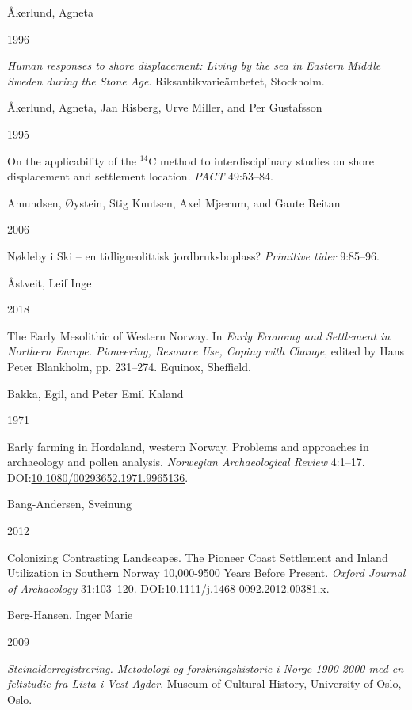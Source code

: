 \documentclass[
]{article}
\newlength{\cslhangindent}
\newlength{\csllabelwidth}
\newlength{\cslentryspacingunit} %
\newenvironment{CSLReferences}[2] %
 {%
  \setlength{\parindent}{0pt}
  \ifodd #1
  \let\oldpar\par
  \def\par{\hangindent=\cslhangindent\oldpar}
  \fi
  \setlength{\parskip}{#2\cslentryspacingunit}
 }%
 {}
\newcommand{\CSLBlock}[1]{#1\hfill\break}
\newcommand{\CSLLeftMargin}[1]{\parbox[t]{\csllabelwidth}{#1}}
\newcommand{\CSLRightInline}[1]{\parbox[t]{\linewidth - \csllabelwidth}{#1}\break}
\begin{document}
\hypertarget{refs}{}
\begin{CSLReferences}{0}{0}
\leavevmode{}%
\CSLBlock{Åkerlund, Agneta}
\CSLLeftMargin{ 1996}
\CSLRightInline{\emph{{Human responses to shore displacement: Living by the sea in Eastern Middle Sweden during the Stone Age}}. Riksantikvarieämbetet, Stockholm.}

\leavevmode{}%
\CSLBlock{Åkerlund, Agneta, Jan Risberg, Urve Miller, and Per Gustafsson}
\CSLLeftMargin{ 1995}
\CSLRightInline{{On the applicability of the \(^{14}\)C method to interdisciplinary studies on shore displacement and settlement location}. \emph{PACT} 49:53--84.}

\leavevmode{}%
\CSLBlock{Amundsen, Øystein, Stig Knutsen, Axel Mjærum, and Gaute Reitan}
\CSLLeftMargin{ 2006}
\CSLRightInline{{Nøkleby i Ski -- en tidligneolittisk jordbruksboplass?} \emph{Primitive tider} 9:85--96.}

\leavevmode{}%
\CSLBlock{Åstveit, Leif Inge}
\CSLLeftMargin{ 2018}
\CSLRightInline{{The Early Mesolithic of Western Norway}. In \emph{{Early Economy and Settlement in Northern Europe. Pioneering, Resource Use, Coping with Change}}, edited by Hans Peter Blankholm, pp. 231--274. Equinox, Sheffield.}

\leavevmode{}%
\CSLBlock{Bakka, Egil, and Peter Emil Kaland}
\CSLLeftMargin{ 1971}
\CSLRightInline{Early farming in Hordaland, western Norway. Problems and approaches in archaeology and pollen analysis. \emph{Norwegian Archaeological Review} 4:1--17. DOI:\href{https://doi.org/10.1080/00293652.1971.9965136}{10.1080/00293652.1971.9965136}.}

\leavevmode{}%
\CSLBlock{Bang-Andersen, Sveinung}
\CSLLeftMargin{ 2012}
\CSLRightInline{Colonizing Contrasting Landscapes. The Pioneer Coast Settlement and Inland Utilization in Southern Norway 10,000-9500 Years Before Present. \emph{Oxford Journal of Archaeology} 31:103--120. DOI:\href{https://doi.org/10.1111/j.1468-0092.2012.00381.x}{10.1111/j.1468-0092.2012.00381.x}.}

\leavevmode{}%
\CSLBlock{Berg-Hansen, Inger Marie}
\CSLLeftMargin{ 2009}
\CSLRightInline{\emph{{Steinalderregistrering. Metodologi og forskningshistorie i Norge 1900-2000 med en feltstudie fra Lista i Vest-Agder}}. Museum of Cultural History, University of Oslo, Oslo.}


\end{CSLReferences}
\end{document}
